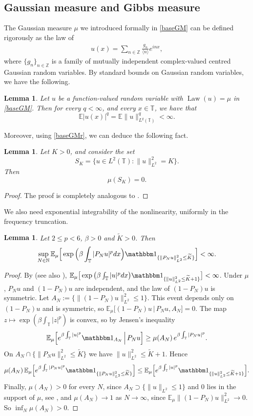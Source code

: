\documentclass[letterpaper, 11pt,  reqno]{amsart}
\newtheorem{lemma}[theorem]{Lemma}
\theoremstyle{definition}
\DeclareMathOperator{\Law}{Law}
\newcommand{\1}{\mathbbm 1}
\newcommand{\Z}{\mathbb{Z}}
\newcommand{\T}{\mathbb{T}}
\newcommand{\0}{\mathbf 0}
\newcommand{\E}{\mathbb{E}}
\newcommand{\be}{\beta}
\newcommand{\wt}{\widetilde}
\newcommand{\jb}[1]
{\langle #1 \rangle}
\newcommand{\N}{\mathbb{N}}
\numberwithin{equation}{section}
\numberwithin{theorem}{section}
\begin{document}
\subsection{Gaussian measure and Gibbs measure}
The Gaussian measure $\mu$ we introduced formally in \eqref{baseGM} can be defined
rigorously as the law of 
\begin{align}
    u(x) = \sum_{n\in \Z} \frac{g_n}{\jb{n}}e^{inx},
    \label{baseGMr}
\end{align}
where $\{g_n\}_{n\in \Z}$ is a family of 
mutually independent complex-valued centred Gaussian random variables. 
By standard bounds on Gaussian random variables, we have the following. 
\begin{lemma}
\label{LEM:GaussInt}
   Let $u$ be a function-valued random variable with $\Law(u) = \mu$ in \eqref{baseGM}. Then for every $ q < \infty$, and every $x \in \T$, we have that 
   \begin{equation}
       \E |u(x)|^q = \E \|u \|_{L^q(\T)}^q < \infty.
   \end{equation}
\end{lemma}
Moreover, using \eqref{baseGMr}, 
we can deduce the following fact.
\begin{lemma} \label{0sphere}
    Let $K > 0$, and consider the set 
    $$ S_K = \{ u \in L^2(\T): \| u \|_{L^2}^2 = K\}.$$
    Then 
    $$ \mu(S_K) = 0.$$
\end{lemma}
\begin{proof}
    The proof is completely analogous to \cite[Lemma 2.7]{RoSeToWa}.
\end{proof}
 
We also need exponential integrability of the nonlinearity, uniformly in the frequency
truncation.
 
\begin{lemma}\label{LEM:unifexp}
Let $2\le p<6$, $\be>0$ and $\wt K>0$. Then
\[
\sup_{N\in\N}\E_\mu\Big[\exp\Big(\be\int_\T|P_Nu|^pdx\Big)\1_{\{\|P_Nu\|_{L^2}^2\le\wt K\}}\Big]<\infty .
\]
\end{lemma}
\begin{proof}
By \cite[Proposition 3.1]{TolWeb} (see also \cite{Lebowitz1988, Bo94}),
$\E_\mu\big[\exp\big(\be\int_\T|u|^pdx\big)\1_{\{\|u\|_{L^2}^2\le\wt K+1\}}\big]<\infty$.
Under $\mu$, $P_Nu$ and $(1-P_N)u$ are independent, and the law of $(1-P_N)u$ is
symmetric. Let $A_N:=\{\|(1-P_N)u\|_{L^2}^2\le1\}$. This event depends only on
$(1-P_N)u$ and is symmetric, so $\E_\mu\big[(1-P_N)u\,\big|\,P_Nu,A_N\big]=0$. The map
$z\mapsto\exp(\be\int_\T|z|^p)$ is convex, so by Jensen's inequality
\[
\E_\mu\Big[e^{\be\int_\T|u|^p}\1_{A_N}\,\Big|\,P_Nu\Big]\ge\mu(A_N)\,e^{\be\int_\T|P_Nu|^p}.
\]
On $A_N\cap\{\|P_Nu\|_{L^2}^2\le\wt K\}$ we have $\|u\|_{L^2}^2\le\wt K+1$. Hence
\[
\mu(A_N)\,\E_\mu\Big[e^{\be\int_\T|P_Nu|^p}\1_{\{\|P_Nu\|_{L^2}^2\le\wt K\}}\Big]
\le\E_\mu\Big[e^{\be\int_\T|u|^p}\1_{\{\|u\|_{L^2}^2\le\wt K+1\}}\Big].
\]
Finally, $\mu(A_N)>0$ for every $N$, since $A_N\supset\{\|u\|_{L^2}\le1\}$ and $0$ lies in the support of $\mu$, see \cite[Theorem 3.6.1]{Bogachev},
and $\mu(A_N)\to1$ as $N\to\infty$, since $\E_\mu\|(1-P_N)u\|_{L^2}^2\to0$. So
$\inf_N\mu(A_N)>0$.
\end{proof}
 
\end{document}
